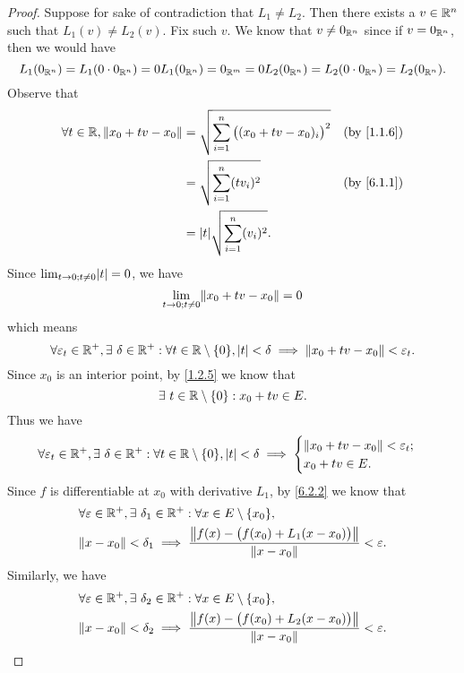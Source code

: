 \begin{proof}
  Suppose for sake of contradiction that \(L_1 \neq L_2\).
  Then there exists a \(v \in \R^n\) such that \(L_1(v) \neq L_2(v)\).
  Fix such \(v\).
  We know that \(v \neq 0_{\R^n}\) since if \(v = 0_{\R^n}\), then we would have
  \[
    L_1(0_{\R^n}) = L_1(0 \cdot 0_{\R^n}) = 0 L_1(0_{\R^n}) = 0_{\R^m} = 0 L_2(0_{\R^n}) = L_2(0 \cdot 0_{\R^n}) = L_2(0_{\R^n}).
  \]
  Observe that
  \begin{align*}
    \forall t \in \R, \norm*{x_0 + tv - x_0} & = \sqrt{\sum_{i = 1}^n \big((x_0 + tv - x_0)_i\big)^2} & \text{(by \cref{1.1.6})} \\
                                             & = \sqrt{\sum_{i = 1}^n (t v_i)^2}                      & \text{(by \cref{6.1.1})} \\
                                             & = \abs{t} \sqrt{\sum_{i = 1}^n (v_i)^2}.
  \end{align*}
  Since \(\lim_{t \to 0 ; t \neq 0} \abs{t} = 0\), we have
  \[
    \lim_{t \to 0 ; t \neq 0} \norm*{x_0 + tv - x_0} = 0
  \]
  which means
  \[
    \forall \varepsilon_t \in \R^+, \exists\ \delta \in \R^+ : \forall t \in \R \setminus \{0\}, \abs{t} < \delta \implies \norm*{x_0 + tv - x_0} < \varepsilon_t.
  \]
  Since \(x_0\) is an interior point, by \cref{1.2.5} we know that
  \[
    \exists\ t \in \R \setminus \{0\} : x_0 + tv \in E.
  \]
  Thus we have
  \[
    \forall \varepsilon_t \in \R^+, \exists\ \delta \in \R^+ : \forall t \in \R \setminus \{0\}, \abs{t} < \delta \implies \begin{cases}
      \norm*{x_0 + tv - x_0} < \varepsilon_t; \\
      x_0 + tv \in E.
    \end{cases}
  \]
  Since \(f\) is differentiable at \(x_0\) with derivative \(L_1\), by \cref{6.2.2} we know that
  \begin{align*}
     & \forall \varepsilon \in \R^+, \exists\ \delta_1 \in \R^+ : \forall x \in E \setminus \{x_0\},                             \\
     & \norm*{x - x_0} < \delta_1 \implies \frac{\norm*{f(x) - \big(f(x_0) + L_1(x - x_0)\big)}}{\norm*{x - x_0}} < \varepsilon.
  \end{align*}
  Similarly, we have
  \begin{align*}
     & \forall \varepsilon \in \R^+, \exists\ \delta_2 \in \R^+ : \forall x \in E \setminus \{x_0\},                             \\
     & \norm*{x - x_0} < \delta_2 \implies \frac{\norm*{f(x) - \big(f(x_0) + L_2(x - x_0)\big)}}{\norm*{x - x_0}} < \varepsilon.

\end{align*}
\end{proof}
